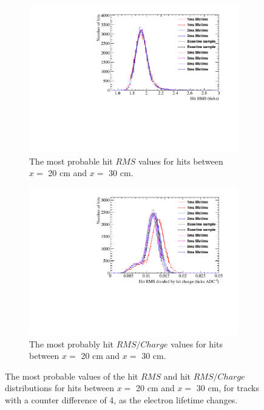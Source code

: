 \begin{figure}
  \centering
  \begin{subfigure}{0.48\textwidth}
    \centering
    \includegraphics[width=\textwidth]{Canvas_RMS_20cm_ElecLifetime}
    \caption{The most probable hit $RMS$ values for hits between $x =$ 20 cm and $x =$ 30 cm.}
  \end{subfigure}%
  \hspace{0.03\textwidth}%
  \begin{subfigure}{0.48\textwidth}
    \centering
    \includegraphics[width=\textwidth]{Canvas_RMS_Q_20cm_ElecLifetime}
    \caption{The most probably hit $RMS/Charge$ values for hits between $x =$ 20 cm and $x =$ 30 cm.}
  \end{subfigure}
  \caption[The most probable values of the hit $RMS$ and hit $RMS/Charge$ distributions for tracks with a counter difference of 4, as the electron lifetime changes]
          {The most probable values of the hit $RMS$ and hit $RMS/Charge$ distributions for hits between $x =$ 20 cm and $x =$ 30 cm, for tracks with a counter difference of 4, as the electron lifetime changes.}
  \label{fig:DiffLifeStudy_HitFit}
\end{figure}


